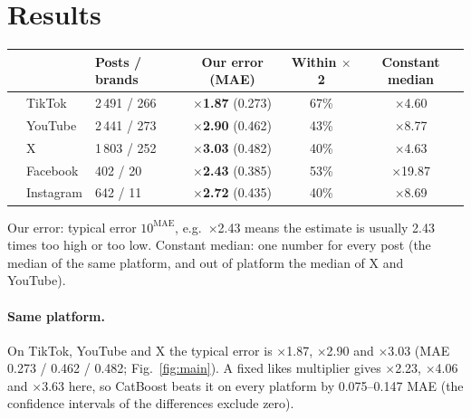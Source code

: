 \documentclass[10pt,a4paper]{article}
\newcommand{\x}[1]{$\times$#1}
\newcommand{\xb}[1]{\textbf{$\boldsymbol{\times}$#1}}
\begin{document}
\section{Results}\label{sec:wyniki}

\begin{tcolorbox}[colback=blue!4,colframe=blue!45!black,boxrule=.6pt,left=4pt,right=4pt,top=3pt,bottom=3pt,
  title={\textbf{Main results: how far off we are on a single post}},fonttitle=\small,coltitle=white,colbacktitle=blue!45!black]
\centering\small
\begin{tabular}{lllccc}
  & & Posts / brands & \textbf{Our error} (MAE) & Within \x{2} & Constant median \\
\midrule
{} & TikTok & 2\,491 / 266 & \xb{1.87} (0.273) & 67\% & \x{4.60} \\
 & YouTube & 2\,441 / 273 & \xb{2.90} (0.462) & 43\% & \x{8.77} \\
 & X & 1\,803 / 252 & \xb{3.03} (0.482) & 40\% & \x{4.63} \\
\midrule
{} & Facebook & 402 / 20 & \xb{2.43} (0.385) & 53\% & \x{19.87} \\
 & Instagram & 642 / 11 & \xb{2.72} (0.435) & 40\% & \x{8.69} \\
\end{tabular}

\smallskip\raggedright\footnotesize Our error: typical error $10^{\text{MAE}}$, e.g.\ \x{2.43} means the estimate is usually 2.43 times
too high or too low. Constant median: one number for every post (the median of the same platform, and out of platform
the median of X and YouTube).
\end{tcolorbox}

\paragraph{Same platform.} On TikTok, YouTube and X the typical error is \x{1.87}, \x{2.90} and \x{3.03}
(MAE 0.273 / 0.462 / 0.482; Fig.~\ref{fig:main}). A fixed likes multiplier gives \x{2.23}, \x{4.06} and \x{3.63} here,
so CatBoost beats it on every platform by 0.075--0.147 MAE (the confidence intervals of the differences exclude zero).
\end{document}

